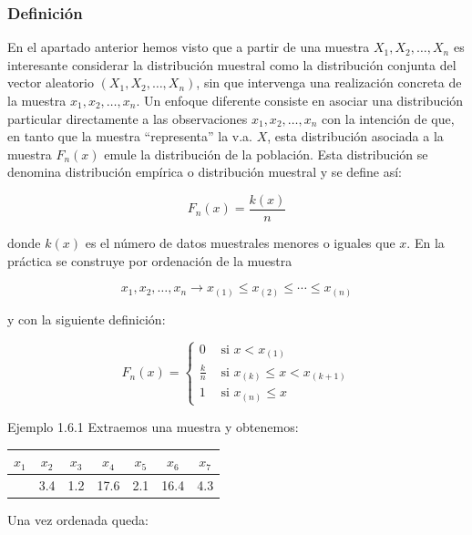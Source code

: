 \documentclass[
]{article}
\begin{document}
\subsubsection{Definición}\label{definiciuxf3n-2}

En el apartado anterior hemos visto que a partir de una muestra \(X_{1}, X_{2}, \ldots, X_{n}\) es interesante considerar la distribución muestral como la distribución conjunta del vector aleatorio \(\left(X_{1}, X_{2}, \ldots, X_{n}\right)\), sin que intervenga una realización concreta de la muestra \(x_{1}, x_{2}, \ldots, x_{n}\). Un enfoque diferente consiste en asociar una distribución particular directamente a las observaciones \(x_{1}, x_{2}, \ldots, x_{n}\) con la intención de que, en tanto que la muestra ``representa'' la v.a. \(X\), esta distribución asociada a la muestra \(F_{n}(x)\) emule la distribución de la población. Esta distribución se denomina distribución empírica o distribución muestral y se define así:

\[
F_{n}(x)=\frac{k(x)}{n}
\]

donde \(k(x)\) es el número de datos muestrales menores o iguales que \(x\). En la práctica se construye por ordenación de la muestra

\[
x_{1}, x_{2}, \ldots, x_{n} \longrightarrow x_{(1)} \leq x_{(2)} \leq \cdots \leq x_{(n)}
\]

y con la siguiente definición:

\[
F_{n}(x)= \begin{cases}0 & \text { si } x<x_{(1)} \\ \frac{k}{n} & \text { si } x_{(k)} \leq x<x_{(k+1)} \\ 1 & \text { si } x_{(n)} \leq x\end{cases}
\]

Ejemplo 1.6.1 Extraemos una muestra y obtenemos:

\begin{longtable}[]{@{}ccccccc@{}}
\toprule\noalign{}
\(x_{1}\) & \(x_{2}\) & \(x_{3}\) & \(x_{4}\) & \(x_{5}\) & \(x_{6}\) & \(x_{7}\) \\
\midrule\noalign{}
\endhead
\bottomrule\noalign{}
\endlastfoot
5.1 & 3.4 & 1.2 & 17.6 & 2.1 & 16.4 & 4.3 \\
\end{longtable}

Una vez ordenada queda:
\end{document}

